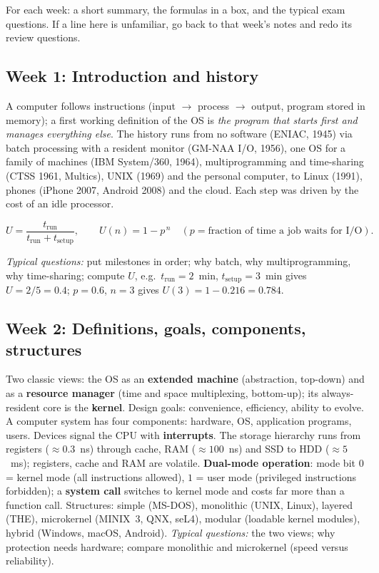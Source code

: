 \documentclass[11pt,a4paper]{article}
\newcommand{\term}[1]{\textbf{\color{mintdeep}#1}}
\begin{document}
For each week: a short summary, the formulas in a box, and the typical exam questions. If a line here is unfamiliar, go back to that week's notes and redo its review questions.

\subsection{Week 1: Introduction and history}
A computer follows instructions (input $\to$ process $\to$ output, program stored in memory); a first working definition of the OS is \emph{the program that starts first and manages everything else}. The history runs from no software (ENIAC, 1945) via batch processing with a resident monitor (GM-NAA I/O, 1956), one OS for a family of machines (IBM System/360, 1964), multiprogramming and time-sharing (CTSS 1961, Multics), UNIX (1969) and the personal computer, to Linux (1991), phones (iPhone 2007, Android 2008) and the cloud. Each step was driven by the cost of an idle processor.
\begin{example}
\[
U = \frac{t_{\text{run}}}{t_{\text{run}} + t_{\text{setup}}}, \qquad U(n) = 1 - p^{\,n}\quad(p = \text{fraction of time a job waits for I/O}).
\]
\end{example}
\textit{Typical questions:} put milestones in order; why batch, why multiprogramming, why time-sharing; compute $U$, e.g.\ $t_{\text{run}} = 2$~min, $t_{\text{setup}} = 3$~min gives $U = 2/5 = 0.4$; $p = 0.6$, $n=3$ gives $U(3) = 1 - 0.216 = 0.784$.

\subsection{Week 2: Definitions, goals, components, structures}
Two classic views: the OS as an \term{extended machine} (abstraction, top-down) and as a \term{resource manager} (time and space multiplexing, bottom-up); its always-resident core is the \term{kernel}. Design goals: convenience, efficiency, ability to evolve. A computer system has four components: hardware, OS, application programs, users. Devices signal the CPU with \term{interrupts}. The storage hierarchy runs from registers ($\approx 0.3$~ns) through cache, RAM ($\approx 100$~ns) and SSD to HDD ($\approx 5$~ms); registers, cache and RAM are volatile. \term{Dual-mode operation}: mode bit $0$ = kernel mode (all instructions allowed), $1$ = user mode (privileged instructions forbidden); a \term{system call} switches to kernel mode and costs far more than a function call. Structures: simple (MS-DOS), monolithic (UNIX, Linux), layered (THE), microkernel (MINIX~3, QNX, seL4), modular (loadable kernel modules), hybrid (Windows, macOS, Android).
\textit{Typical questions:} the two views; why protection needs hardware; compare monolithic and microkernel (speed versus reliability).
\end{document}
